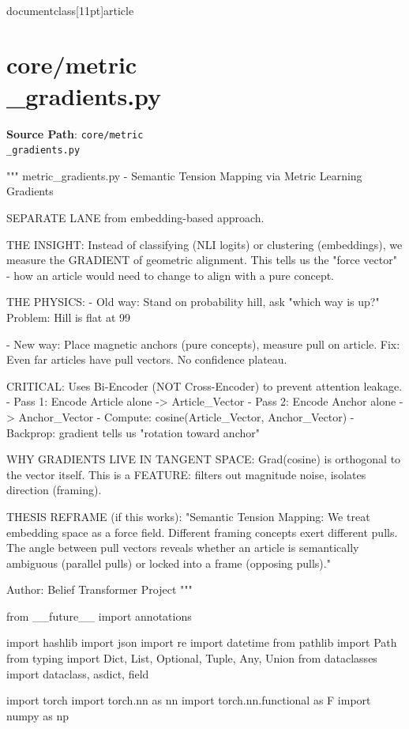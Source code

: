 \\documentclass[11pt]{article}
\begin{document}
\section*{core/metric\\_gradients.py}
\textbf{Source Path}: \texttt{core/metric\\_gradients.py}\par
\bigskip
\begin{CodeBlock}
"""
metric_gradients.py - Semantic Tension Mapping via Metric Learning Gradients

SEPARATE LANE from embedding-based approach.

THE INSIGHT:
Instead of classifying (NLI logits) or clustering (embeddings), we measure
the GRADIENT of geometric alignment. This tells us the "force vector" -
how an article would need to change to align with a pure concept.

THE PHYSICS:
- Old way: Stand on probability hill, ask "which way is up?"
  Problem: Hill is flat at 99%
  
- New way: Place magnetic anchors (pure concepts), measure pull on article.
  Fix: Even far articles have pull vectors. No confidence plateau.

CRITICAL: Uses Bi-Encoder (NOT Cross-Encoder) to prevent attention leakage.
- Pass 1: Encode Article alone -> Article_Vector
- Pass 2: Encode Anchor alone -> Anchor_Vector  
- Compute: cosine(Article_Vector, Anchor_Vector)
- Backprop: gradient tells us "rotation toward anchor"

WHY GRADIENTS LIVE IN TANGENT SPACE:
Grad(cosine) is orthogonal to the vector itself.
This is a FEATURE: filters out magnitude noise, isolates direction (framing).

THESIS REFRAME (if this works):
"Semantic Tension Mapping: We treat embedding space as a force field.
Different framing concepts exert different pulls. The angle between pull
vectors reveals whether an article is semantically ambiguous (parallel pulls)
or locked into a frame (opposing pulls)."

Author: Belief Transformer Project
"""

from __future__ import annotations

import hashlib
import json
import re
import datetime
from pathlib import Path
from typing import Dict, List, Optional, Tuple, Any, Union
from dataclasses import dataclass, asdict, field

import torch
import torch.nn as nn
import torch.nn.functional as F
import numpy as np



\end{CodeBlock}
\end{document}
